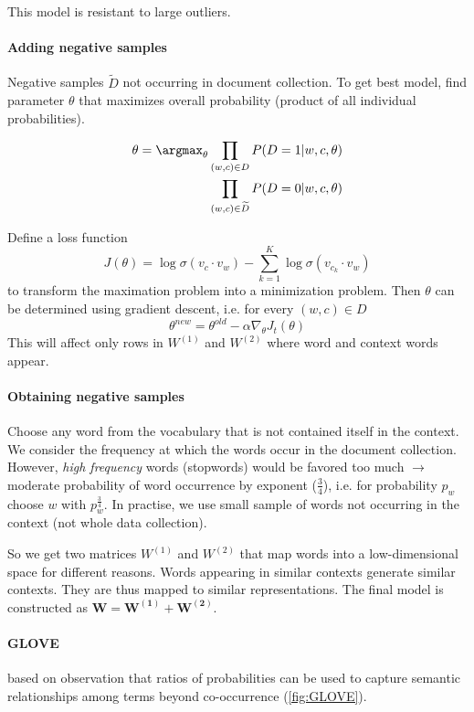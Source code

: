 This model is resistant to large outliers.

\paragraph{Adding negative samples} Negative samples $\widetilde{D}$ not occurring in document collection. To get best model, find parameter $\theta$ that maximizes overall probability (product of all individual probabilities).

\begin{align*}
  \theta = \argmax_{\theta} \prod_{(w,c) \in D} P(D = 1 | w, c, \theta) \\
  \prod_{(w,c) \in \widetilde{D}} P(D = 0 | w, c, \theta)
\end{align*}

Define a loss function
$$ J(\theta) = \log \sigma(v_c \cdot v_w) - \sum^K_{k=1} \log \sigma(v_{c_k} \cdot v_w)
$$
to transform the maximation problem into a minimization problem. Then $\theta$ can be determined using gradient descent, i.e. for every $(w,c) \in D$
$$ \theta^{new} = \theta^{old} - \alpha \nabla_\theta J_t(\theta)
$$
This will affect only rows in $W^{(1)}$ and $W^{(2)}$ where word and context words appear.

\paragraph{Obtaining negative samples} Choose any word from the vocabulary that is not contained itself in the context. We consider the frequency at which the words occur in the document collection. However, \emph{high frequency} words (stopwords) would be favored too much $\longrightarrow$ moderate probability of word occurrence by exponent ($\frac{3}{4}$), i.e. for probability $p_w$ choose $w$ with $p_w^{\frac{3}{4}}$. In practise, we use small sample of words not occurring in the context (not whole data collection).

So we get two matrices $W^{(1)}$ and $W^{(2)}$ that map words into a low-dimensional space for different reasons. Words appearing in similar contexts generate similar contexts. They are thus mapped to similar representations. The final model is constructed as $\mathbf{W = W^{(1)} + W^{(2)}}$.

\paragraph{GLOVE} based on observation that ratios of probabilities can be used to capture semantic relationships among terms beyond co-occurrence (\cref{fig:GLOVE}).

